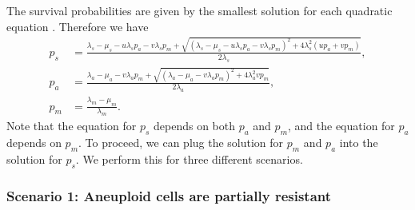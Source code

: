 \documentclass[12pt]{extarticle}
\begin{document}
\begin{appendices}
The survival probabilities are given by the smallest solution for each quadratic equation \citep{uecker2015adaptive}. Therefore we have
\begin{equation}\label{eq:survival_prob}
\begin{aligned}
p_s &= \frac{\lambda_s-\mu_s-u\lambda_sp_a-v\lambda_sp_m+\sqrt{\left(\lambda_s-\mu_s-u\lambda_sp_a-v\lambda_sp_m\right)^2+4\lambda_s^2\left(up_a+vp_m\right)}}{2\lambda_s} ,\\
p_a &= \frac{\lambda_a-\mu_a-v\lambda_ap_m+\sqrt{\left(\lambda_a-\mu_a-v\lambda_ap_m\right)^2+4\lambda_a^2vp_m}}{2\lambda_a}, \\
p_m &= \frac{\lambda_m-\mu_m}{\lambda_m} .
\end{aligned} 
\end{equation}
Note that the equation for $p_s$ depends on both $p_a$ and $p_m$, and the equation for $p_a$ depends on $p_m$.
To proceed, we can plug the solution for $p_m$ and $p_a$ into the solution for $p_s$. We perform this for three different scenarios.

\subsubsection*{Scenario 1: Aneuploid cells are partially resistant} 


\end{appendices}
\end{document}
